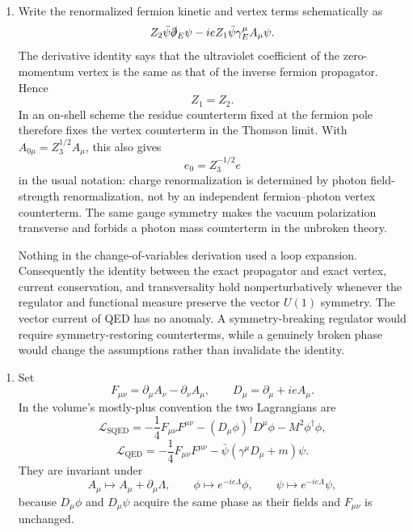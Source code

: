 \begin{enumerate}
\begin{enumerate}
Let \(p_2=p_1-q\), and normalize the amputated vertex so that it includes
the charge \(e\).  Fourier transforming the connected current insertion
and factoring its two exact external propagators gives
\[
 \ii q_\mu G(\slashed p_1)V_3^\mu(q,p_1,p_2)G(\slashed p_2)
 =ie\left[G(\slashed p_2)-G(\slashed p_1)\right].
\]
Multiplication by the inverse propagators on the two sides yields the
exact identity
\[
 \boxed{\;
 \ii q_\mu V_3^\mu(q,p_1,p_2)
 =ie\left[G^{-1}(\slashed p_1)
 -G^{-1}(\slashed p_1-\slashed q)\right].\;}
\]
At zero momentum transfer this becomes
\[
 \boxed{\;
 V_3^\mu(0,p,p)
 =e\,\frac{\partial G^{-1}(\slashed p)}{\partial p_\mu}. \;}
\]
This derivative form is a useful check on every factor of \(i\) and on the
momentum routing.
\item
Write the renormalized fermion kinetic and vertex terms schematically as
\[
 Z_2\bar\psi\slashed\partial_E\psi
 -ieZ_1\bar\psi\gamma_E^\mu A_\mu\psi.
\]
The derivative identity says that the ultraviolet coefficient of the
zero-momentum vertex is the same as that of the inverse fermion
propagator.  Hence
\[
 \boxed{Z_1=Z_2.}
\]
In an on-shell scheme the residue counterterm fixed at the fermion pole
therefore fixes the vertex counterterm in the Thomson limit.  With
\(A_{0\mu}=Z_3^{1/2}A_\mu\), this also gives
\[
 e_0=Z_3^{-1/2}e
\]
in the usual notation: charge renormalization is determined by photon
field-strength renormalization, not by an independent fermion--photon
vertex counterterm.  The same gauge symmetry makes the vacuum
polarization transverse and forbids a photon mass counterterm in the
unbroken theory.

Nothing in the change-of-variables derivation used a loop expansion.
Consequently the identity between the exact propagator and exact vertex,
current conservation, and transversality hold nonperturbatively whenever
the regulator and functional measure preserve the vector \(U(1)\)
symmetry.  The vector current of QED has no anomaly.  A symmetry-breaking
regulator would require symmetry-restoring counterterms, while a genuinely
broken phase would change the assumptions rather than invalidate the
identity.
\end{enumerate}

\begin{enumerate}
\item
Set
\[
 F_{\mu\nu}=\partial_\mu A_\nu-\partial_\nu A_\mu,
 \qquad D_\mu=\partial_\mu+ieA_\mu.
\]
In the volume's mostly-plus convention the two Lagrangians are
\[
 \boxed{\mathcal L_{\mathrm{SQED}}
 =-\frac14F_{\mu\nu}F^{\mu\nu}
 -(D_\mu\phi)^\dagger D^\mu\phi-M^2\phi^\dagger\phi,}
\]
\[
 \boxed{\mathcal L_{\mathrm{QED}}
 =-\frac14F_{\mu\nu}F^{\mu\nu}
 -\bar\psi(\gamma^\mu D_\mu+m)\psi.}
\]
They are invariant under
\[
 A_\mu\longmapsto A_\mu+\partial_\mu\Lambda,\qquad
 \phi\longmapsto e^{-ie\Lambda}\phi,\qquad
 \psi\longmapsto e^{-ie\Lambda}\psi,
\]
because \(D_\mu\phi\) and \(D_\mu\psi\) acquire the same phase as their
fields and \(F_{\mu\nu}\) is unchanged.


\end{enumerate}
\end{enumerate}
